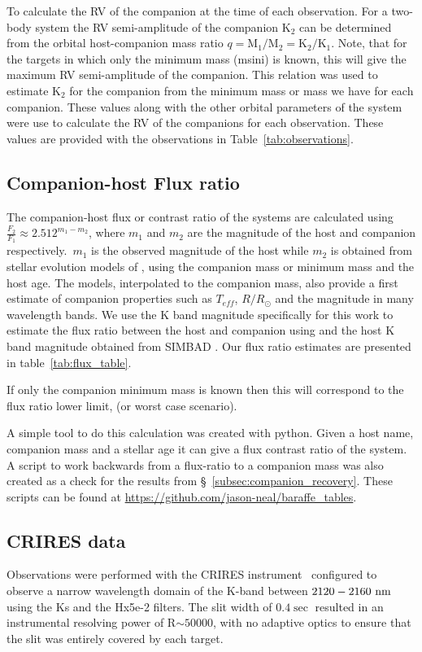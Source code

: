 To calculate the RV of the companion at the time of each observation. For a two-body system the RV semi-amplitude of the companion $\textrm{K}_{2}$ can be determined from the orbital host-companion mass ratio $q = \textrm{M}_{1}/\textrm{M}_{2} = \textrm{K}_{2}/\textrm{K}_{1}$.
Note, that for the targets in which only the minimum mass (msini) is known, this will give the maximum RV semi-amplitude of the companion.
This relation was used to estimate $\textrm{K}_2$ for the companion from the minimum mass or mass we have for each companion. These values along with the other orbital parameters of the system were use to calculate the RV of the companions for each observation. These values are provided with the observations in Table~\ref{tab:observations}.


\subsection{Companion-host Flux ratio}
The companion-host flux or contrast ratio of the systems are calculated using $ \frac{F_{2}}{F_{1}} \approx 2.512^{m_1-m_2} $, where $m_1$ and $m_2$ are the magnitude of the host and companion respectively.\ $m_1$ is the observed magnitude of the host while $m_2$ is obtained from stellar evolution models of \citet{baraffe_evolutionary_2003, baraffe_new_2015}, using the companion mass or minimum mass and the host age. The models, interpolated to the companion mass, also provide a first estimate of companion properties such as $T_{eff}$, $R/R_{\odot}$ and the magnitude in many wavelength bands.
We use the K band magnitude specifically for this work to estimate the flux ratio between the host and companion using and the host K band magnitude obtained from SIMBAD \citep{wenger_simbad_2000}. Our flux ratio estimates are presented in table~\ref{tab:flux_table}.

If only the companion minimum mass is known then this will correspond to the flux ratio lower limit, (or worst case scenario).


A simple tool to do this calculation was created with python. Given a host name, companion mass and a stellar age it can give a flux contrast ratio of the system. A script to work backwards from a flux-ratio to a companion mass was also created as a check for the results from \S~\ref{subsec:companion_recovery}. These scripts can be found at \url{https://github.com/jason-neal/baraffe_tables}.

\subsection{CRIRES data}
\label{subsec:CRIRES}
Observations were performed with the CRIRES instrument~\citep{kaeufl_crires_2004} configured to observe a narrow wavelength domain of the K-band between \(\rm2120-2160~nm \) using the Ks and the Hx5e-2 filters. The slit width of \(0.4\sec \) resulted in an instrumental resolving power of R\(\sim50000 \), with no adaptive optics to ensure that the slit was entirely covered by each target.

